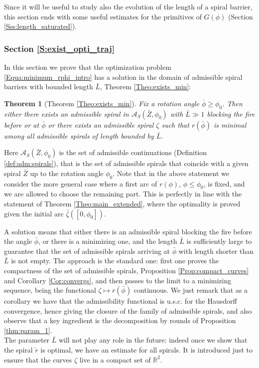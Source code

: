 \documentclass[reqno]{amsart}
\theoremstyle{definition} \newtheorem{definition}{Definition}[section]
\theoremstyle{definition} \newtheorem{remark}[definition]{Remark}
\theoremstyle{plain} \newtheorem{lemma}[definition]{Lemma}
\theoremstyle{plain} \newtheorem{proposition}[definition]{Proposition}
\theoremstyle{plain} \newtheorem{theorem}[definition]{Theorem}
\theoremstyle{plain} \newtheorem{corollary}[definition]{Corollary}
\theoremstyle{definition} \newtheorem{example}[definition]{Example}
\theoremstyle{plain} \newtheorem{claim}[clai]{Claim}
\theoremstyle{definition} \newtheorem{assumption}[definition]{Assumption}
\theoremstyle{definition} \newtheorem{observation}[definition]{Observation}
\newcommand{\R}{\mathbb{R}}
\newcommand{\1}{\mathbbm 1}
\numberwithin{equation}{section} %
\theoremstyle{plain} \newtheorem*{theorem*}{Theorem}
\theoremstyle{plain} \newtheorem{mthm}[maintheorem]{Main Theorem}
\theoremstyle{plain} \newtheorem*{mthm*}{Main Theorem}
\theoremstyle{plain} \newtheorem*{conjecture*}{Conjecture}
\theoremstyle{plain} \newtheorem{conjecture}[definition]{Conjecture}
\theoremstyle{plain} \newtheorem*{problem*}{Problem}
\begin{document}
Since it will be useful to study also the evolution of the length of a spiral barrier, this section ends with some useful estimates for the primitives of $G(\phi)$ (Section \ref{Sss:length_saturated}).


\subsubsection{Section \ref{S:exist_opti_traj}}
\label{Sss:exists_opti_intro}


In this section we prove that the optimization problem \eqref{Equa:minimum_rphi_intro} has a solution in the domain of admissible spiral barriers with bounded length $\bar L$, Theorem \ref{Theo:exists_min}:

\begin{theorem}[Theorem \ref{Theo:exists_min}]
\label{Theo:exists_min_intro}
Fix a rotation angle ${\bar \phi} \geq {\phi_0}$. Then either there exists an admissible spiral in $\mathcal A_S(\bar Z,{\phi_0})$ with $\bar L \gg 1$ blocking the fire before or at ${\bar \phi}$ or there exists an admissible spiral $\zeta$ such that $r({\bar \phi})$ is minimal among all admissible spirals of length bounded by $\bar L$.
\end{theorem}

Here $\mathcal{A}_S(\bar Z,\phi_0)$ is the set of admissible continuations (Definition \ref{def:adm:spirals}), that is the set of admissible spirals that coincide with a given spiral $\bar Z$ up to the rotation angle $\phi_0$.
Note that in the above statement we consider the more general case where a first arc of $r(\phi)$, $\phi \leq \phi_0$, is fixed, and we are allowed to choose the remaining part. This is perfectly in line with the statement of Theorem \ref{Theo:main_extended}, where the optimality is proved given the initial arc $\bar \zeta([0,\phi_0])$.

A solution means that either there is an admissible spiral blocking the fire before the angle $\bar \phi$, or there is a minimizing one, and the length $\bar L$ is sufficiently large to guarantee that the set of admissible spirals arriving at $\bar\phi$ with length shorter than $\bar L$ is not empty. The approach is the standard one: first one proves the compactness of the set of admissible spirals, Proposition \ref{Prop:compact_curves} and Corollary \ref{Cor:convergs}, and then passes to the limit to a minimizing sequence, being the functional $\zeta \mapsto r(\bar \phi)$ continuous. We just remark that as a corollary we have that the admissibility functional is u.s.c. for the Hausdorff convergence, hence giving the closure of the family of admissible spirals, and also observe that a key ingredient is the decomposition by rounds of Proposition \ref{thm:param_1}. \\
The parameter $\bar L$ will not play any role in the future: indeed once we show that the spiral $\check r$ is optimal, we have an estimate for all spirals. It is introduced just to ensure that the curves $\zeta$ live in a compact set of $\R^2$.
\end{document}
